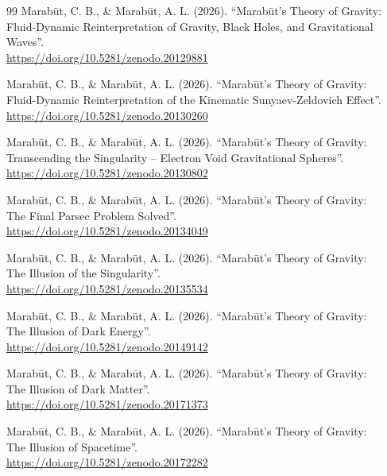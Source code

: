 \documentclass[11pt, a4paper]{article}
\begin{document}
\begin{thebibliography}{99}
  Marab\={u}t, C. B., \& Marab\={u}t, A. L. (2026). ``Marab\={u}t's Theory of Gravity: \\
  Fluid-Dynamic Reinterpretation of Gravity, Black Holes, and Gravitational Waves''. \\ \url{https://doi.org/10.5281/zenodo.20129881}

  Marab\={u}t, C. B., \& Marab\={u}t, A. L. (2026). ``Marab\={u}t's Theory of Gravity: \\
  Fluid-Dynamic Reinterpretation of the Kinematic Sunyaev-Zeldovich Effect''. \\
  \url{https://doi.org/10.5281/zenodo.20130260}

  Marab\={u}t, C. B., \& Marab\={u}t, A. L. (2026). ``Marab\={u}t's Theory of Gravity: \\
  Transcending the Singularity -- Electron Void Gravitational Spheres''. \\
  \url{https://doi.org/10.5281/zenodo.20130802}

  Marab\={u}t, C. B., \& Marab\={u}t, A. L. (2026). ``Marab\={u}t's Theory of Gravity: \\
  The Final Parsec Problem Solved''. \\
  \url{https://doi.org/10.5281/zenodo.20134049}

  Marab\={u}t, C. B., \& Marab\={u}t, A. L. (2026). ``Marab\={u}t's Theory of Gravity: \\
  The Illusion of the Singularity''. \\
  \url{https://doi.org/10.5281/zenodo.20135534}

  Marab\={u}t, C. B., \& Marab\={u}t, A. L. (2026). ``Marab\={u}t's Theory of Gravity: \\
  The Illusion of Dark Energy''. \\
  \url{https://doi.org/10.5281/zenodo.20149142}

  Marab\={u}t, C. B., \& Marab\={u}t, A. L. (2026). ``Marab\={u}t's Theory of Gravity: \\
  The Illusion of Dark Matter''. \\
  \url{https://doi.org/10.5281/zenodo.20171373}

  Marab\={u}t, C. B., \& Marab\={u}t, A. L. (2026). ``Marab\={u}t's Theory of Gravity: \\
  The Illusion of Spacetime''. \\
  \url{https://doi.org/10.5281/zenodo.20172282}


\end{thebibliography}
\end{document}
